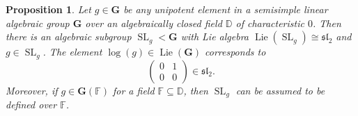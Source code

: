 \documentclass[12pt]{amsart}
\newcommand{\F}{\mathbb{F} }
\newcommand{\D}{\mathbb{D} }
\newcommand{\bG}{\mathbf{G}}
\numberwithin{equation}{section}
\newtheorem{proposition}[theorem]{Proposition}
\theoremstyle{remark} %
\begin{document}
\begin{proposition}\label{prop:Jacobson_Morozov_group}
	Let $g\in \bG$ be any unipotent element in a semisimple linear algebraic group $\bG$ over an algebraically closed field $\D$ of characteristic $0$. Then there is an algebraic subgroup $\operatorname{SL}_g < \bG$ with Lie algebra $\operatorname{Lie}(\operatorname{SL}_g) \cong \mathfrak{sl}_2$ and $g \in \operatorname{SL}_g$. The element $\log(g) \in \operatorname{Lie}(\bG)$ corresponds to %
	$$
	\begin{pmatrix}
		0 & 1 \\ 0 & 0
	\end{pmatrix}\in \mathfrak{sl}_2.
	$$
	Moreover, if $g\in \bG(\F)$ for a field $\F \subseteq \D$, then $\operatorname{SL}_g$ can be assumed to be defined over $\F$. 
\end{proposition} 
\end{document}
